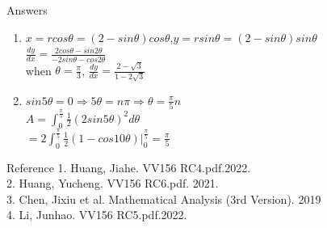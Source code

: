 \begin{frame}{Answers}
    \begin{enumerate}
        \item
              $x=r cos\theta= (2-sin\theta)cos\theta$,$y=r sin\theta =(2-sin\theta) sin\theta$\\
              $\frac{dy}{dx}=\frac{2cos\theta-sin2\theta}{-2sin\theta-cos2\theta}$\\
              when $\theta = \frac{\pi}{3}$, $\frac{dy}{dx}=\frac{2-\sqrt{3}}{1-2\sqrt{3}}$
        \item
              $sin 5\theta= 0 \Rightarrow 5\theta=n\pi \Rightarrow \theta=\frac{\pi}{5} n$\\
              $A=\int_0^{\frac{\pi}{5}} \frac{1}{2}(2sin5\theta)^2 d\theta$\\
              $=2 \int_0^{\frac{\pi}{5}}\frac{1}{2}(1-cos10\theta)|_0^{\frac{\pi}{5}}=\frac{\pi}{5}$\\
    \end{enumerate}
\end{frame}

\begin{frame}{Reference}
    1. Huang, Jiahe. VV156 RC4.pdf.2022.\\
    2. Huang, Yucheng. VV156 RC6.pdf. 2021.\\
    3. Chen, Jixiu et al. Mathematical Analysis (3rd Version). 2019\\
    4. Li, Junhao. VV156 RC5.pdf.2022.
\end{frame}

